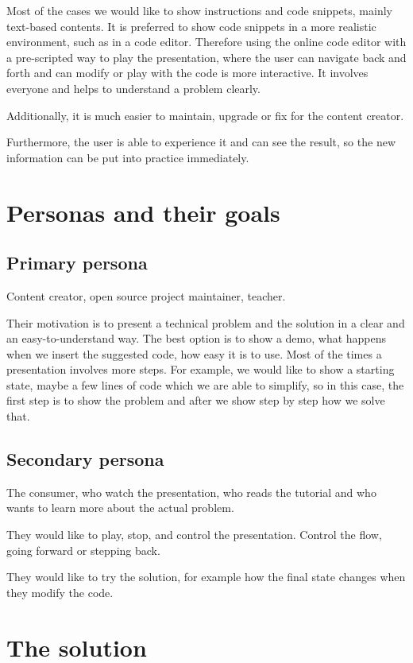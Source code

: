 \documentclass[11pt, a4paper, twoside, openright]{report}
\begin{document}
Most of the cases we would like to show instructions and code snippets, mainly text-based contents. It is preferred to show code snippets in a more realistic environment, such as in a code editor. Therefore using the online code editor with a pre-scripted way to play the presentation, where the user can navigate back and forth and can modify or play with the code is more interactive. It involves everyone and helps to understand a problem clearly.

Additionally, it is much easier to maintain, upgrade or fix for the content creator.

Furthermore, the user is able to experience it and can see the result, so the new information can be put into practice immediately.

\section{Personas and their goals}

\subsection{Primary persona}

Content creator, open source project maintainer, teacher.

Their motivation is to present a technical problem and the solution in a clear and an easy-to-understand way. The best option is to show a demo, what happens when we insert the suggested code, how easy it is to use. Most of the times a presentation involves more steps. For example, we would like to show a starting state, maybe a few lines of code which we are able to simplify, so in this case, the first step is to show the problem and after we show step by step how we solve that.

\subsection{Secondary persona}

The consumer, who watch the presentation, who reads the tutorial and who wants to learn more about the actual problem.

They would like to play, stop, and control the presentation. Control the flow, going forward or stepping back.

They would like to try the solution, for example how the final state changes when they modify the code.

\section{The solution}
\end{document}
